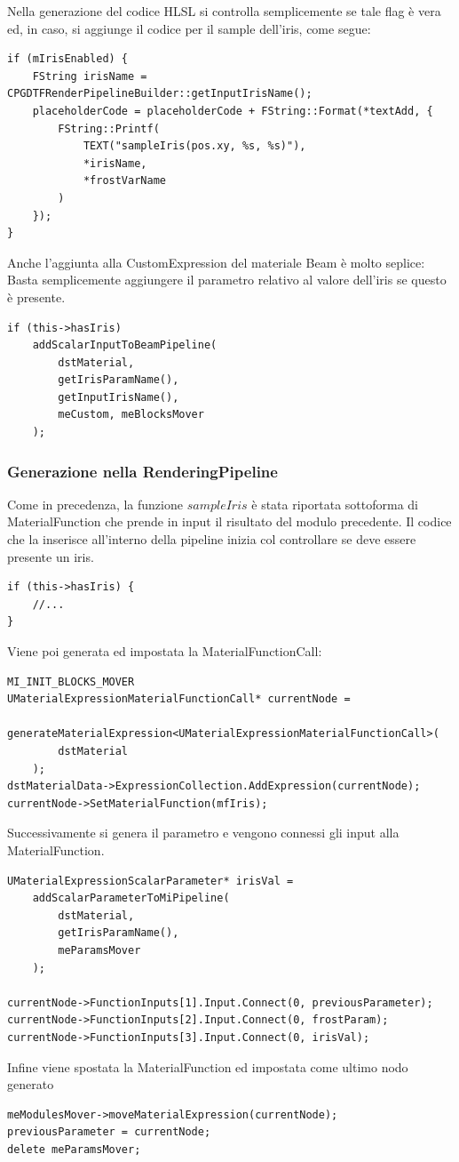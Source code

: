 \documentclass[main.tex]{subfiles}
\begin{document}
Nella generazione del codice HLSL si controlla semplicemente se tale flag è vera ed, in caso, si aggiunge il codice per il sample dell'iris, come segue:
\begin{lstlisting}
if (mIrisEnabled) {
    FString irisName = CPGDTFRenderPipelineBuilder::getInputIrisName();
    placeholderCode = placeholderCode + FString::Format(*textAdd, {
        FString::Printf(
            TEXT("sampleIris(pos.xy, %s, %s)"),
            *irisName,
            *frostVarName
        )
    });
}
\end{lstlisting}

Anche l'aggiunta alla CustomExpression del materiale Beam è molto seplice: Basta semplicemente aggiungere il parametro relativo al valore dell'iris se questo è presente.
\begin{lstlisting}
if (this->hasIris)
    addScalarInputToBeamPipeline(
        dstMaterial,
        getIrisParamName(),
        getInputIrisName(),
        meCustom, meBlocksMover
    );
\end{lstlisting}

\subsubsection{Generazione nella RenderingPipeline}\label{subsec:5_2_IrisRenderingPipeline}
Come in precedenza, la funzione $sampleIris$ è stata riportata sottoforma di MaterialFunction che prende in input il risultato del modulo precedente. Il codice che la inserisce all'interno della pipeline inizia col controllare se deve essere presente un iris.
\begin{lstlisting}
if (this->hasIris) {
    //...
}
\end{lstlisting}

Viene poi generata ed impostata la MaterialFunctionCall:
\begin{lstlisting}
MI_INIT_BLOCKS_MOVER
UMaterialExpressionMaterialFunctionCall* currentNode =
    generateMaterialExpression<UMaterialExpressionMaterialFunctionCall>(
        dstMaterial
    );
dstMaterialData->ExpressionCollection.AddExpression(currentNode);
currentNode->SetMaterialFunction(mfIris);
\end{lstlisting}
Successivamente si genera il parametro e vengono connessi gli input alla MaterialFunction.
\begin{lstlisting}
UMaterialExpressionScalarParameter* irisVal =
    addScalarParameterToMiPipeline(
        dstMaterial,
        getIrisParamName(),
        meParamsMover
    );

currentNode->FunctionInputs[1].Input.Connect(0, previousParameter);
currentNode->FunctionInputs[2].Input.Connect(0, frostParam);
currentNode->FunctionInputs[3].Input.Connect(0, irisVal);
\end{lstlisting}
Infine viene spostata la MaterialFunction ed impostata come ultimo nodo generato
\begin{lstlisting}
meModulesMover->moveMaterialExpression(currentNode);
previousParameter = currentNode;
delete meParamsMover;
\end{lstlisting}
\end{document}
